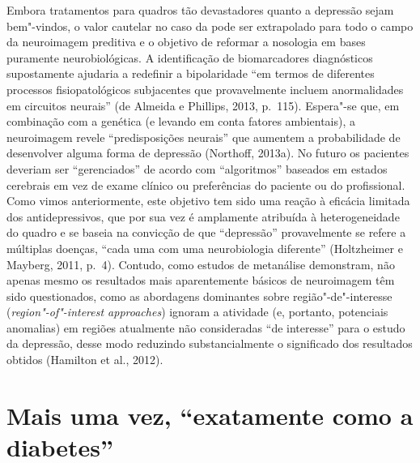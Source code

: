 Embora tratamentos para quadros tão devastadores quanto a depressão
sejam bem"-vindos, o valor cautelar no caso da  pode ser extrapolado
para todo o campo da neuroimagem preditiva e o objetivo de reformar a
nosologia em bases puramente neurobiológicas. A identificação de
biomarcadores diagnósticos supostamente ajudaria a redefinir a
bipolaridade ``em termos de diferentes processos fisiopatológicos
subjacentes que provavelmente incluem anormalidades em circuitos
neurais'' (de Almeida e Phillips, 2013, p.~115). Espera"-se que, em
combinação com a genética (e levando em conta fatores ambientais), a
neuroimagem revele ``predisposições neurais'' que aumentem a
probabilidade de desenvolver alguma forma de depressão (Northoff,
2013a). No futuro os pacientes deveriam ser ``gerenciados'' de acordo
com ``algoritmos'' baseados em estados cerebrais em vez de exame clínico
ou preferências do paciente ou do profissional. Como vimos
anteriormente, este objetivo tem sido uma reação à eficácia limitada dos
antidepressivos, que por sua vez é amplamente atribuída à
heterogeneidade do quadro e se baseia na convicção de que ``depressão''
provavelmente se refere a múltiplas doenças, ``cada uma com uma
neurobiologia diferente'' (Holtzheimer e Mayberg, 2011, p.~4). Contudo,
como estudos de metanálise demonstram, não apenas mesmo os resultados
mais aparentemente básicos de neuroimagem têm sido questionados, como as
abordagens dominantes sobre região"-de"-interesse
(\emph{region"-of"-interest approaches}) ignoram a atividade (e, portanto,
potenciais anomalias) em regiões atualmente não consideradas ``de
interesse'' para o estudo da depressão, desse modo reduzindo
substancialmente o significado dos resultados obtidos (Hamilton et al.,
2012).

\chapter{Mais uma vez, ``exatamente como a diabetes''}

